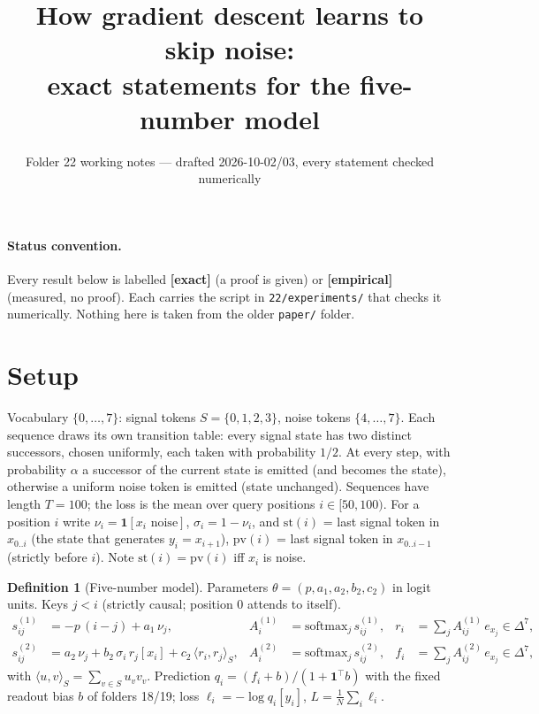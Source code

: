 \documentclass[11pt]{article}
\title{How gradient descent learns to skip noise:\\ exact statements for the five-number model}
\author{Folder 22 working notes --- drafted 2026-10-02/03, every statement checked numerically}
\date{}
\theoremstyle{definition}
\newtheorem{definition}{Definition}
\theoremstyle{remark}
\newcommand{\1}{\mathbf{1}}
\newcommand{\ip}[2]{\langle #1,#2\rangle_{S}}
\begin{document}
\maketitle

\paragraph{Status convention.} Every result below is labelled \textbf{[exact]} (a proof is given)
or \textbf{[empirical]} (measured, no proof). Each carries the script in
\texttt{22/experiments/} that checks it numerically. Nothing here is taken from the older
\texttt{paper/} folder.

\section{Setup}

Vocabulary $\{0,\dots,7\}$: signal tokens $S=\{0,1,2,3\}$, noise tokens $\{4,\dots,7\}$.
Each sequence draws its own transition table: every signal state has two distinct successors,
chosen uniformly, each taken with probability $1/2$. At every step, with probability $\alpha$ a
successor of the current state is emitted (and becomes the state), otherwise a uniform noise
token is emitted (state unchanged). Sequences have length $T=100$; the loss is the mean over
query positions $i\in[50,100)$. For a position $i$ write
$\nu_i=\1[x_i\text{ noise}]$, $\sigma_i = 1-\nu_i$, and
$\mathrm{st}(i)$ = last signal token in $x_{0..i}$ (the state that generates $y_i=x_{i+1}$),
$\mathrm{pv}(i)$ = last signal token in $x_{0..i-1}$ (strictly before $i$).
Note $\mathrm{st}(i)=\mathrm{pv}(i)$ iff $x_i$ is noise.

\begin{definition}[Five-number model]
Parameters $\theta=(p,a_1,a_2,b_2,c_2)$ in logit units. Keys $j<i$ (strictly causal; position $0$
attends to itself).
\begin{align*}
s^{(1)}_{ij} &= -p\,(i-j) + a_1\,\nu_j, & A^{(1)}_i &= \mathrm{softmax}_j\, s^{(1)}_{ij}, & r_i &= \textstyle\sum_j A^{(1)}_{ij}\, e_{x_j}\in\Delta^7,\\
s^{(2)}_{ij} &= a_2\,\nu_j + b_2\,\sigma_i\, r_j[x_i] + c_2\,\ip{r_i}{r_j}, & A^{(2)}_i &= \mathrm{softmax}_j\, s^{(2)}_{ij}, & f_i &= \textstyle\sum_j A^{(2)}_{ij}\, e_{x_j}\in\Delta^7,
\end{align*}
with $\ip{u}{v}=\sum_{v\in S}u_v v_v$. Prediction $q_i=(f_i+b)/(1+\1^\top b)$ with the fixed
readout bias $b$ of folders 18/19; loss $\ell_i=-\log q_i[y_i]$, $L=\frac1N\sum_i\ell_i$.
\end{definition}
\end{document}
